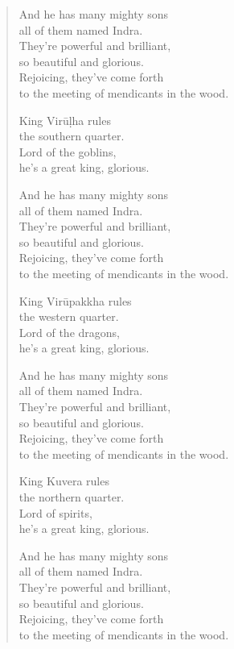 \documentclass[12pt,openany]{book}%
\begin{document}
\begin{verse}
And he has many mighty sons \\
all of them named Indra. \\
They’re powerful and brilliant, \\
so beautiful and glorious. \\
Rejoicing, they’ve come forth \\
to the meeting of mendicants in the wood. 

King \textsanskrit{Virūḷha} rules \\
the southern quarter. \\
Lord of the goblins, \\
he’s a great king, glorious. 

And he has many mighty sons \\
all of them named Indra. \\
They’re powerful and brilliant, \\
so beautiful and glorious. \\
Rejoicing, they’ve come forth \\
to the meeting of mendicants in the wood. 

King \textsanskrit{Virūpakkha} rules \\
the western quarter. \\
Lord of the dragons, \\
he’s a great king, glorious. 

And he has many mighty sons \\
all of them named Indra. \\
They’re powerful and brilliant, \\
so beautiful and glorious. \\
Rejoicing, they’ve come forth \\
to the meeting of mendicants in the wood. 

King Kuvera rules \\
the northern quarter. \\
Lord of spirits, \\
he’s a great king, glorious. 

And he has many mighty sons \\
all of them named Indra. \\
They’re powerful and brilliant, \\
so beautiful and glorious. \\
Rejoicing, they’ve come forth \\
to the meeting of mendicants in the wood. 


\end{verse}
\end{document}
